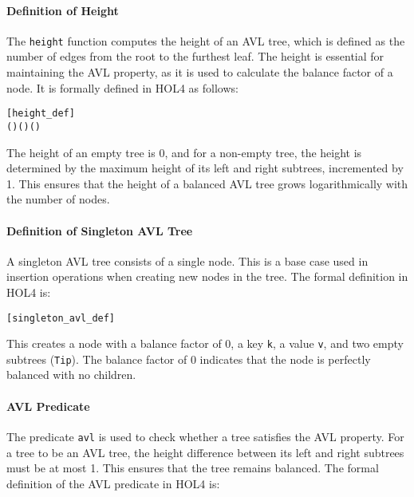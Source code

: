 \documentclass[12pt]{article}
\begin{document}
\paragraph{Definition of Height}
The \texttt{height} function computes the height of an AVL tree, which is defined as the number of edges from the root to the furthest leaf. The height is essential for maintaining the AVL property, as it is used to calculate the balance factor of a node. It is formally defined in HOL4 as follows:

\begin{alltt}
[height_def]
  \HOLTokenDefEquality{} 
 (     ) \HOLTokenDefEquality{}  ( ) ( ) \HOLSymConst{\ensuremath{+}} 
\end{alltt}

The height of an empty tree is 0, and for a non-empty tree, the height is determined by the maximum height of its left and right subtrees, incremented by 1. This ensures that the height of a balanced AVL tree grows logarithmically with the number of nodes.

\paragraph{Definition of Singleton AVL Tree}
A singleton AVL tree consists of a single node. This is a base case used in insertion operations when creating new nodes in the tree. The formal definition in HOL4 is:

\begin{alltt}
[singleton_avl_def]
   \HOLTokenDefEquality{}      
\end{alltt}

This creates a node with a balance factor of 0, a key \texttt{k}, a value \texttt{v}, and two empty subtrees (\texttt{Tip}). The balance factor of 0 indicates that the node is perfectly balanced with no children.

\paragraph{AVL Predicate}
The predicate \texttt{avl} is used to check whether a tree satisfies the AVL property. For a tree to be an AVL tree, the height difference between its left and right subtrees must be at most 1. This ensures that the tree remains balanced. The formal definition of the AVL predicate in HOL4 is:
\end{document}
